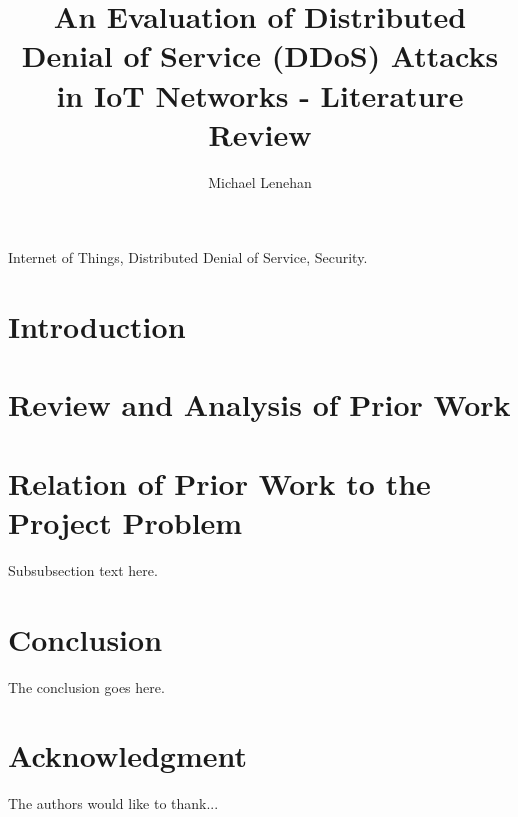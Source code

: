 \documentclass[a4paper, journal]{IEEEtran}
\begin{document}
\hypersetup{pageanchor=false}

\hypersetup{pageanchor=true}
\title{An Evaluation of Distributed Denial of Service (DDoS) Attacks in IoT
Networks - Literature Review}
\author{Michael Lenehan}

%
{}

\maketitle

\begin{abstract}
	
\end{abstract}

\begin{IEEEkeywords}
	Internet of Things, Distributed Denial of Service, Security.
\end{IEEEkeywords}

\section{Introduction}


\section{Review and Analysis of Prior Work}


\section{Relation of Prior Work to the Project Problem}
Subsubsection text here.

\section{Conclusion}
The conclusion goes here.

\section*{Acknowledgment}

The authors would like to thank...


\printbibliography
\end{document}
